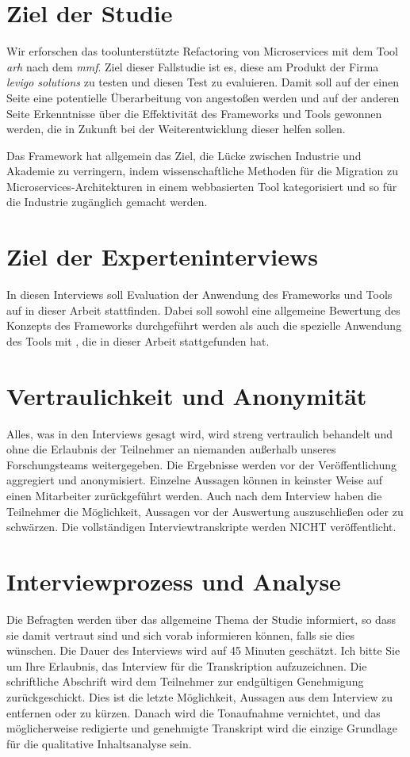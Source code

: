 \section{Ziel der Studie}

Wir erforschen das toolunterstützte Refactoring von Microservices mit dem Tool \emph{\acrlong{arh}} nach dem \emph{\acrlong{mmf}}.
Ziel dieser Fallstudie ist es, diese am Produkt \jf der Firma \emph{levigo solutions} zu testen und diesen Test zu evaluieren.
Damit soll auf der einen Seite eine potentielle Überarbeitung von \jf angestoßen werden und auf der anderen Seite Erkenntnisse über die Effektivität des Frameworks und Tools gewonnen werden, die in Zukunft bei der Weiterentwicklung dieser helfen sollen.

Das Framework hat allgemein das Ziel, die Lücke zwischen Industrie und Akademie zu verringern, indem wissenschaftliche Methoden für die Migration zu Microservices-Architekturen in einem webbasierten Tool kategorisiert und so für die Industrie zugänglich gemacht werden.

\section{Ziel der Experteninterviews}

In diesen Interviews soll Evaluation der Anwendung des Frameworks und Tools auf \jf in dieser Arbeit stattfinden.
Dabei soll sowohl eine allgemeine Bewertung des Konzepts des Frameworks durchgeführt werden als auch die spezielle Anwendung des Tools mit \jf, die in dieser Arbeit stattgefunden hat.

\section{Vertraulichkeit und Anonymität}
Alles, was in den Interviews gesagt wird, wird streng vertraulich behandelt und ohne die Erlaubnis der Teilnehmer an niemanden außerhalb unseres Forschungsteams weitergegeben.
Die Ergebnisse werden vor der Veröffentlichung aggregiert und anonymisiert.
Einzelne Aussagen können in keinster Weise auf einen Mitarbeiter zurückgeführt werden.
Auch nach dem Interview haben die Teilnehmer die Möglichkeit, Aussagen vor der Auswertung auszuschließen oder zu schwärzen.
Die vollständigen Interviewtranskripte werden NICHT veröffentlicht.

\section{Interviewprozess und Analyse}
Die Befragten werden über das allgemeine Thema der Studie informiert, so dass sie damit vertraut sind und sich vorab informieren können, falls sie dies wünschen.
Die Dauer des Interviews wird auf 45 Minuten geschätzt.
Ich bitte Sie um Ihre Erlaubnis, das Interview für die Transkription aufzuzeichnen.
Die schriftliche Abschrift wird dem Teilnehmer zur endgültigen Genehmigung zurückgeschickt.
Dies ist die letzte Möglichkeit, Aussagen aus dem Interview zu entfernen oder zu kürzen.
Danach wird die Tonaufnahme vernichtet, und das möglicherweise redigierte und genehmigte Transkript wird die einzige Grundlage für die qualitative Inhaltsanalyse sein.


